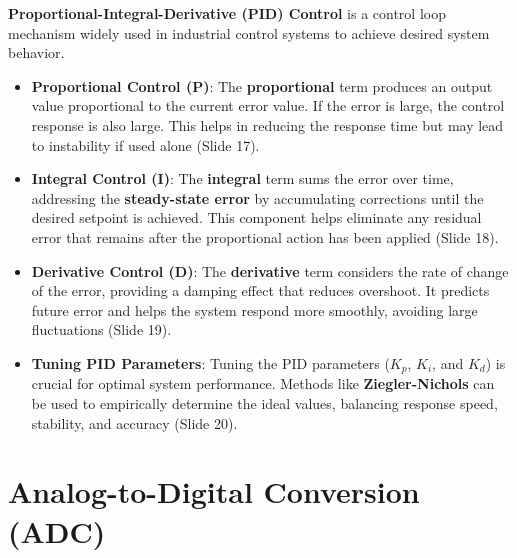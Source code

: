 \documentclass[
  14pt,
  a4paper,
  numbers=noendperiod,
  headinclude=true,
  footinclude=true,
  DIV=calc]{scrreprt}
\begin{document}
\textbf{Proportional-Integral-Derivative (PID) Control} is a control
loop mechanism widely used in industrial control systems to achieve
desired system behavior.

\begin{itemize}
\item
  \textbf{Proportional Control (P)}: The \textbf{proportional} term
  produces an output value proportional to the current error value. If
  the error is large, the control response is also large. This helps in
  reducing the response time but may lead to instability if used alone
  (Slide 17).
\item
  \textbf{Integral Control (I)}: The \textbf{integral} term sums the
  error over time, addressing the \textbf{steady-state error} by
  accumulating corrections until the desired setpoint is achieved. This
  component helps eliminate any residual error that remains after the
  proportional action has been applied (Slide 18).
\item
  \textbf{Derivative Control (D)}: The \textbf{derivative} term
  considers the rate of change of the error, providing a damping effect
  that reduces overshoot. It predicts future error and helps the system
  respond more smoothly, avoiding large fluctuations (Slide 19).
\item
  \textbf{Tuning PID Parameters}: Tuning the PID parameters (\(K_p\),
  \(K_i\), and \(K_d\)) is crucial for optimal system performance.
  Methods like \textbf{Ziegler-Nichols} can be used to empirically
  determine the ideal values, balancing response speed, stability, and
  accuracy (Slide 20).
\end{itemize}

\section{Analog-to-Digital Conversion
(ADC)}\label{analog-to-digital-conversion-adc}
\end{document}
